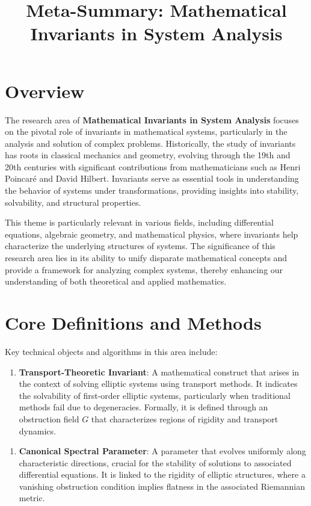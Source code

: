 \documentclass[11pt,a4paper]{article}
\title{Meta-Summary: Mathematical Invariants in System Analysis}
\date{}
\begin{document}
\maketitle

\section{Overview}

The research area of \textbf{Mathematical Invariants in System Analysis} focuses on the pivotal role of invariants in mathematical systems, particularly in the analysis and solution of complex problems. Historically, the study of invariants has roots in classical mechanics and geometry, evolving through the 19th and 20th centuries with significant contributions from mathematicians such as Henri Poincaré and David Hilbert. Invariants serve as essential tools in understanding the behavior of systems under transformations, providing insights into stability, solvability, and structural properties.

This theme is particularly relevant in various fields, including differential equations, algebraic geometry, and mathematical physics, where invariants help characterize the underlying structures of systems. The significance of this research area lies in its ability to unify disparate mathematical concepts and provide a framework for analyzing complex systems, thereby enhancing our understanding of both theoretical and applied mathematics.

\section{Core Definitions and Methods}

Key technical objects and algorithms in this area include:

\begin{enumerate}
\item \textbf{Transport-Theoretic Invariant}: A mathematical construct that arises in the context of solving elliptic systems using transport methods. It indicates the solvability of first-order elliptic systems, particularly when traditional methods fail due to degeneracies. Formally, it is defined through an obstruction field \( G \) that characterizes regions of rigidity and transport dynamics.
\end{enumerate}

\begin{enumerate}
\item \textbf{Canonical Spectral Parameter}: A parameter that evolves uniformly along characteristic directions, crucial for the stability of solutions to associated differential equations. It is linked to the rigidity of elliptic structures, where a vanishing obstruction condition implies flatness in the associated Riemannian metric.
\end{enumerate}
\end{document}
